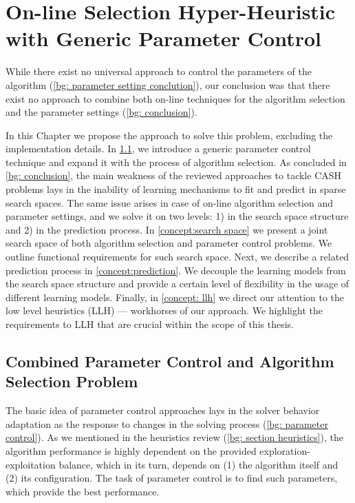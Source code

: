 \chapter{On-line Selection Hyper-Heuristic with Generic Parameter Control}\label{Concept description}
While there exist no universal approach to control the parameters of the algorithm (\cref{bg: parameter setting conclution}), our conclusion was that there exist no approach to combine both on-line techniques for the algorithm selection and the parameter settings (\cref{bg: conclusion}). 

In this Chapter we propose the approach to solve this problem, excluding the implementation details. In \cref{concept:parameter control}, we introduce a generic parameter control technique and expand it with the process of algorithm selection. As concluded in \cref{bg: conclusion}, the main weakness of the reviewed approaches to tackle CASH problems lays in the inability of learning mechanisms to fit and predict in sparse search spaces. The same issue arises in case of on-line algorithm selection and parameter settings, and we solve it on two levels: 1) in the search space structure and 2) in the prediction process. In \cref{concept:search space} we present a joint search space of both algorithm selection and parameter control problems. We outline functional requirements for such search space. Next, we describe a related prediction process in \cref{concept:prediction}. We decouple the learning models from the search space structure and provide a certain level of flexibility in the usage of different learning models.
Finally, in \cref{concept: llh} we direct our attention to the low level heuristics (LLH) — workhorses of our approach. We highlight the requirements to LLH that are crucial within the scope of this thesis.


\section{Combined Parameter Control and Algorithm Selection Problem}\label{concept:parameter control}
The basic idea of parameter control approaches lays in the solver behavior adaptation as the response to changes in the solving process (\cref{bg: parameter control}). As we mentioned in the heuristics review (\cref{bg: section heuristics}), the algorithm performance is highly dependent on the provided exploration-exploitation balance, which in its turn, depends on (1) the algorithm itself and (2) its configuration. The task of parameter control is to find such parameters, which provide the best performance.

